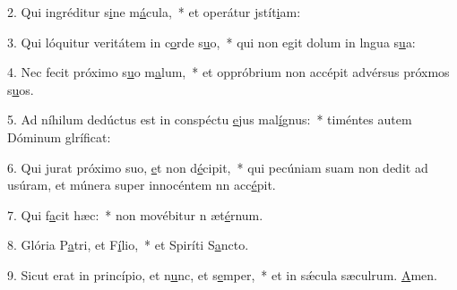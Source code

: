 2. Qui ingréditur s\uline{i}ne m\uline{á}cula,~* et operátur jstít\uline{i}am:\par 
3. Qui lóquitur veritátem in c\uline{o}rde s\uline{u}o,~* qui non egit dolum in lngua s\uline{u}a:\par 
4. Nec fecit próximo s\uline{u}o m\uline{a}lum,~* et oppróbrium non accépit advérsus próxmos s\uline{u}os.\par 
5. Ad níhilum dedúctus est in conspéctu \uline{e}jus mal\uline{í}gnus:~* timéntes autem Dóminum glríf\uline{i}cat:\par 
6. Qui jurat próximo suo, \uline{e}t non d\uline{é}cipit,~* qui pecúniam suam non dedit ad usúram, et múnera super innocéntem nn acc\uline{é}pit.\par 
7. Qui f\uline{a}cit hæc:~* non movébitur n æt\uline{é}rnum.\par 
8. Glória P\uline{a}tri, et F\uline{í}lio,~* et Spiríti S\uline{a}ncto.\par 
9. Sicut erat in princípio, et n\uline{u}nc, et s\uline{e}mper,~* et in sǽcula sæculrum. \uline{A}men.\par 
